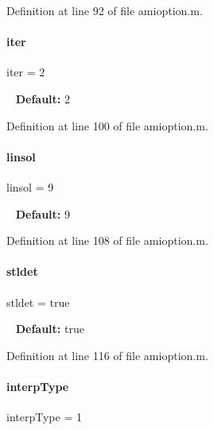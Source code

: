 Definition at line 92 of file amioption.\+m.

\mbox{\label{classamioption_a1fc3ae6bd5c6a80e9b81b27fc7b7a11a}} 
\paragraph{\texorpdfstring{iter}{iter}}
{\footnotesize\ttfamily iter = 2}

~\newline
{\bfseries Default\+:} 2 

Definition at line 100 of file amioption.\+m.

\mbox{\label{classamioption_a06749b49eaa313f4d00f0115d3a7a7f3}} 
\paragraph{\texorpdfstring{linsol}{linsol}}
{\footnotesize\ttfamily linsol = 9}

~\newline
{\bfseries Default\+:} 9 

Definition at line 108 of file amioption.\+m.

\mbox{\label{classamioption_a202e02f7d8c1a87b1c675bcc1acf1c8e}} 
\paragraph{\texorpdfstring{stldet}{stldet}}
{\footnotesize\ttfamily stldet = true}

~\newline
{\bfseries Default\+:} true 

Definition at line 116 of file amioption.\+m.

\mbox{\label{classamioption_ad06cc805fa18b06ac937fd98a9eba0e7}} 
\paragraph{\texorpdfstring{interp\+Type}{interpType}}
{\footnotesize\ttfamily interp\+Type = 1}

